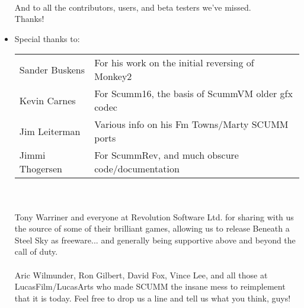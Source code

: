 \begin{itemize}
~\\
And to all the contributors, users, and beta testers we've missed.\\
Thanks!
\item Special thanks to:\\
  \begin{tabular}{ll}
    Sander Buskens  & For his work on the initial reversing of Monkey2\\
    Kevin Carnes    & For Scumm16, the basis of ScummVM older gfx codec\\
    Jim Leiterman   & Various info on his Fm Towns/Marty SCUMM ports\\
    Jimmi Thogersen & For ScummRev, and much obscure code/documentation\\
  \end{tabular}\\
~\\
  Tony Warriner and everyone at Revolution Software Ltd. for sharing
  with us the source of some of their brilliant games, allowing us to
  release Beneath a Steel Sky as freeware... and generally being
  supportive above and beyond the call of duty.\\
  ~\\
  Aric Wilmunder, Ron Gilbert, David Fox, Vince Lee, and all those at
  LucasFilm/LucasArts who made SCUMM the insane mess to reimplement
  that it is today. Feel free to drop us a line and tell us what you
  think, guys!
\end{itemize}
